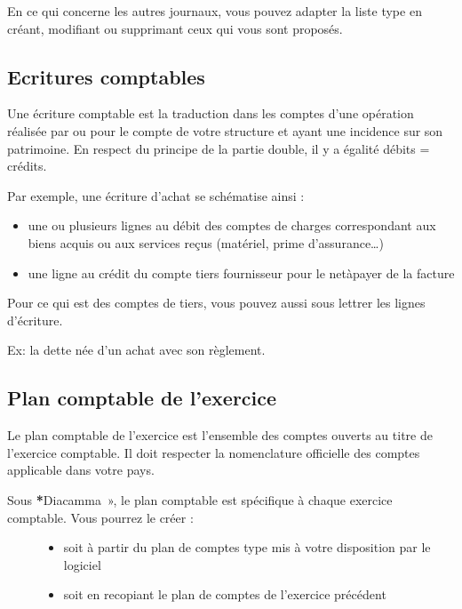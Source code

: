 \documentclass[a4paper,10pt,oneside,french]{sphinxmanual}
\begin{document}
En ce qui concerne les autres journaux, vous pouvez adapter la liste type en créant, modifiant ou supprimant ceux qui vous sont proposés.


\subsection{Ecritures comptables}
\label{\detokenize{accounting/definition:ecritures-comptables}}
Une écriture comptable est la traduction dans les comptes d’une opération réalisée par ou pour le compte de votre structure et ayant une incidence sur son patrimoine. En respect du principe de la partie double, il y a égalité débits = crédits.

Par exemple, une écriture d’achat se schématise ainsi :
\begin{itemize}
\item {} 
une ou plusieurs lignes au débit des comptes de charges correspondant aux biens acquis ou aux services reçus (matériel, prime d’assurance…)

\item {} 
une ligne au crédit du compte tiers fournisseur pour le net\sphinxhyphen{}à\sphinxhyphen{}payer de la facture

\end{itemize}

Pour ce qui est des comptes de tiers, vous pouvez aussi sous  lettrer les lignes d’écriture.

Ex: la dette née d’un achat avec son règlement.


\subsection{Plan comptable de l’exercice}
\label{\detokenize{accounting/definition:plan-comptable-de-l-exercice}}
Le plan comptable de l’exercice est l’ensemble des comptes ouverts au titre de l’exercice comptable. Il doit respecter  la nomenclature officielle des comptes applicable dans votre pays.
\begin{description}
\item[{Sous {\color{red}\bfseries{}*}Diacamma », le plan comptable est spécifique à chaque exercice comptable. Vous pourrez le créer :}] \leavevmode\begin{itemize}
\item {} 
soit  à partir du plan de comptes type mis à votre disposition par le logiciel

\item {} 
soit en recopiant le plan de comptes de l’exercice précédent

\end{itemize}

\end{description}
\end{document}
